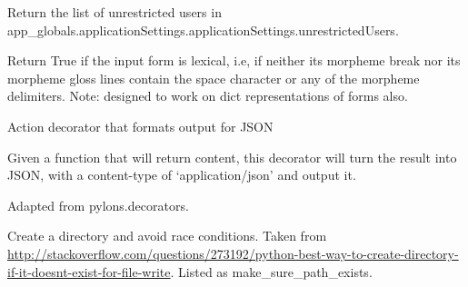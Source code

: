 \documentclass[letterpaper,10pt,english]{sphinxmanual}
\begin{document}

\begin{fulllineitems}
\label{api:old.lib.utils.getUnrestrictedUsers}
Return the list of unrestricted users in
app\_globals.applicationSettings.applicationSettings.unrestrictedUsers.

\end{fulllineitems}


\begin{fulllineitems}
\label{api:old.lib.utils.isLexical}
Return True if the input form is lexical, i.e, if neither its morpheme
break nor its morpheme gloss lines contain the space character or any of the
morpheme delimiters.  Note: designed to work on dict representations of forms
also.

\end{fulllineitems}


\begin{fulllineitems}
\label{api:old.lib.utils.jsonify}
Action decorator that formats output for JSON

Given a function that will return content, this decorator will turn
the result into JSON, with a content-type of `application/json' and
output it.

Adapted from pylons.decorators.

\end{fulllineitems}


\begin{fulllineitems}
\label{api:old.lib.utils.makeDirectorySafely}
Create a directory and avoid race conditions.  Taken from 
\href{http://stackoverflow.com/questions/273192/python-best-way-to-create-directory-if-it-doesnt-exist-for-file-write}{http://stackoverflow.com/questions/273192/python-best-way-to-create-directory-if-it-doesnt-exist-for-file-write}.
Listed as make\_sure\_path\_exists.

\end{fulllineitems}
\end{document}
